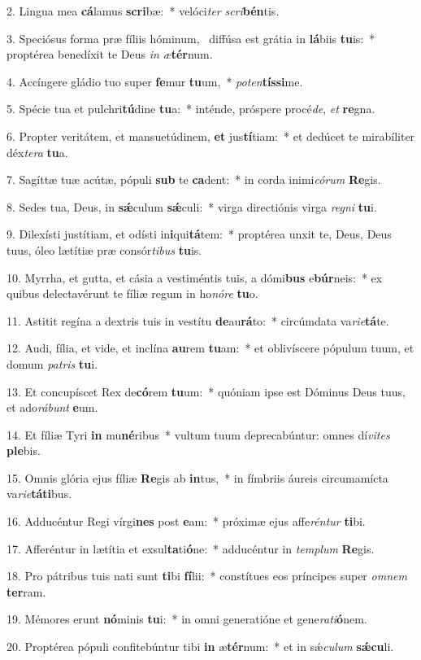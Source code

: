 2. Lingua mea \textbf{cá}lamus \textbf{scri}bæ:~*  velóci\textit{ter} \textit{scri}\textbf{bén}tis.\

3. Speciósus forma præ fíliis hóminum, \dag\  diffúsa est grátia in \textbf{lá}biis \textbf{tu}is:~*  proptérea benedíxit te Deus \textit{in} \textit{æ}\textbf{tér}num.\

4. Accíngere gládio tuo super \textbf{fe}mur \textbf{tu}um,~*  \textit{pot}\textit{en}\textbf{tís}\textbf{si}me.\

5. Spécie tua et pulchri\textbf{tú}dine \textbf{tu}a:~*  inténde, próspere procé\textit{de}, \textit{et} \textbf{re}gna.\

6. Propter veritátem, et mansuetúdinem, \textbf{et} jus\textbf{tí}tiam:~*  et dedúcet te mirabíliter déx\textit{te}\textit{ra} \textbf{tu}a.\

7. Sagíttæ tuæ acútæ, pópuli \textbf{sub} te \textbf{ca}dent:~*  in corda inimi\textit{có}\textit{rum} \textbf{Re}gis.\

8. Sedes tua, Deus, in \textbf{sǽ}culum \textbf{sǽ}culi:~*  virga directiónis virga \textit{re}\textit{gni} \textbf{tu}i.\

9. Dilexísti justítiam, et odísti in\textbf{i}qui\textbf{tá}tem:~*  proptérea unxit te, Deus, Deus tuus, óleo lætítiæ præ consór\textit{ti}\textit{bus} \textbf{tu}is.\

10. Myrrha, et gutta, et cásia a vestiméntis tuis, a dómi\textbf{bus} e\textbf{búr}neis:~*  ex quibus delectavérunt te fíliæ regum in ho\textit{nó}\textit{re} \textbf{tu}o.\

11. Astitit regína a dextris tuis in vestítu \textbf{de}au\textbf{rá}to:~*  circúmdata va\textit{ri}\textit{e}\textbf{tá}te.\

12. Audi, fília, et vide, et inclína \textbf{au}rem \textbf{tu}am:~*  et oblivíscere pópulum tuum, et domum \textit{pa}\textit{tris} \textbf{tu}i.\

13. Et concupíscet Rex de\textbf{có}rem \textbf{tu}um:~*  quóniam ipse est Dóminus Deus tuus, et ado\textit{rá}\textit{bunt} \textbf{e}um.\

14. Et fíliæ Tyri \textbf{in} mu\textbf{né}ribus~*  vultum tuum deprecabúntur: omnes dí\textit{vi}\textit{tes} \textbf{ple}bis.\

15. Omnis glória ejus fíliæ \textbf{Re}gis ab \textbf{in}tus,~*  in fímbriis áureis circumamícta va\textit{ri}\textit{e}\textbf{tá}\textbf{ti}bus.\

16. Adducéntur Regi vírgi\textbf{nes} post \textbf{e}am:~*  próximæ ejus affe\textit{rén}\textit{tur} \textbf{ti}bi.\

17. Afferéntur in lætítia et exsul\textbf{ta}ti\textbf{ó}ne:~*  adducéntur in \textit{tem}\textit{plum} \textbf{Re}gis.\

18. Pro pátribus tuis nati sunt \textbf{ti}bi \textbf{fí}lii:~*  constítues eos príncipes super \textit{om}\textit{nem} \textbf{ter}ram.\

19. Mémores erunt \textbf{nó}minis \textbf{tu}i:~*  in omni generatióne et gene\textit{ra}\textit{ti}\textbf{ó}nem.\

20. Proptérea pópuli confitebúntur tibi \textbf{in} æ\textbf{tér}num:~*  et in sǽ\textit{cu}\textit{lum} \textbf{sǽ}\textbf{cu}li.\

